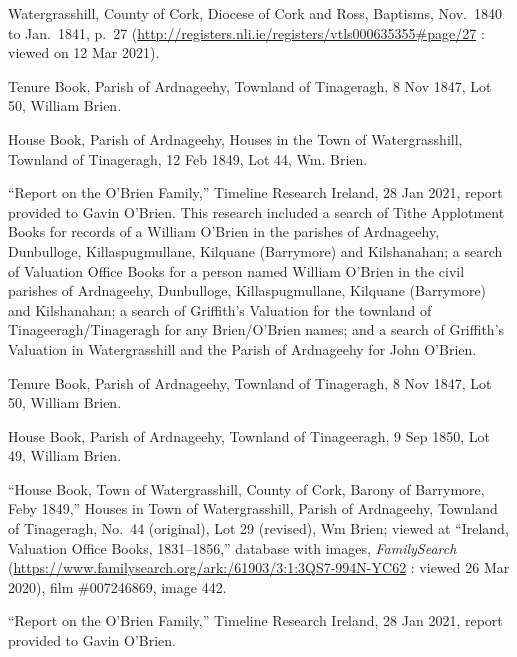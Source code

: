\begin{thebibliography}{999}
Watergrasshill, County of Cork, Diocese of Cork and Ross, Baptisms, Nov.\ 1840 to Jan.\ 1841, p.\ 27 (\url{http://registers.nli.ie/registers/vtls000635355\#page/27} : viewed on 12 Mar 2021).


Tenure Book, Parish of Ardnageehy, Townland of Tinageragh, 8 Nov 1847, Lot 50, William Brien.

House Book, Parish of Ardnageehy, Houses in the Town of Watergrasshill, Townland of Tinageragh, 12 Feb 1849, Lot 44, Wm. Brien.

``Report on the O'Brien Family,'' Timeline Research Ireland, 28 Jan 2021, report provided to Gavin O'Brien.
This research included a search of Tithe Applotment Books for records of a William O'Brien in the parishes of Ardnageehy, Dunbulloge, Killaspugmullane, Kilquane (Barrymore) and Kilshanahan; a search of Valuation Office Books for a person named William O'Brien in the civil parishes of Ardnageehy, Dunbulloge, Killaspugmullane, Kilquane (Barrymore) and Kilshanahan; a search of Griffith's Valuation for the townland of Tinageeragh/Tinageragh for any Brien/O'Brien names; and a search of Griffith's Valuation in Watergrasshill and the Parish of Ardnageehy for John O'Brien.

Tenure Book, Parish of Ardnageehy, Townland of Tinageragh, 8 Nov 1847, Lot 50, William Brien.

House Book, Parish of Ardnageehy, Townland of Tinageeragh, 9 Sep 1850, Lot 49, William Brien.

``House Book, Town of Watergrasshill, County of Cork, Barony of Barrymore, Feby 1849,'' Houses in Town of Watergrasshill, Parish of Ardnageehy, Townland of Tinageragh, No.\ 44 (original), Lot 29 (revised), Wm Brien; viewed at ``Ireland, Valuation Office Books, 1831--1856,'' database with images, \textit{FamilySearch} (\url{https://www.familysearch.org/ark:/61903/3:1:3QS7-994N-YC62} : viewed 26 Mar 2020), film \#007246869, image 442.

``Report on the O'Brien Family,'' Timeline Research Ireland, 28 Jan 2021, report provided to Gavin O'Brien.


\end{thebibliography}
